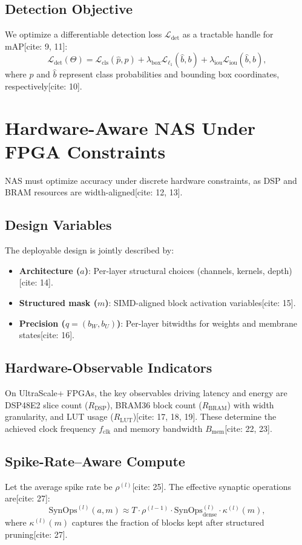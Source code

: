 \documentclass[10pt,journal,compsoc]{IEEEtran}
\newcommand{\SynOps}{\text{SynOps}}
\begin{document}
\subsection{Detection Objective}
We optimize a differentiable detection loss $\mathcal{L}_{\text{det}}$ as a tractable handle for mAP[cite: 9, 11]:
\begin{equation}
\mathcal{L}_{\text{det}}(\Theta) = \mathcal{L}_{\text{cls}}(\hat{p}, p) + \lambda_{\text{box}}\mathcal{L}_{\ell_1}(\hat{b}, b) + \lambda_{\text{iou}}\mathcal{L}_{\text{iou}}(\hat{b}, b),
\end{equation}
where $\hat{p}$ and $\hat{b}$ represent class probabilities and bounding box coordinates, respectively[cite: 10].

\section{Hardware-Aware NAS Under FPGA Constraints}
NAS must optimize accuracy under discrete hardware constraints, as DSP and BRAM resources are width-aligned[cite: 12, 13].

\subsection{Design Variables}
The deployable design is jointly described by:
\begin{itemize}
    \item \textbf{Architecture ($a$)}: Per-layer structural choices (channels, kernels, depth)[cite: 14].
    \item \textbf{Structured mask ($m$)}: SIMD-aligned block activation variables[cite: 15].
    \item \textbf{Precision ($q = (b_W, b_U)$)}: Per-layer bitwidths for weights and membrane states[cite: 16].
\end{itemize}

\subsection{Hardware-Observable Indicators}
On UltraScale+ FPGAs, the key observables driving latency and energy are DSP48E2 slice count ($R_{\text{DSP}}$), BRAM36 block count ($R_{\text{BRAM}}$) with width granularity, and LUT usage ($R_{\text{LUT}}$)[cite: 17, 18, 19]. These determine the achieved clock frequency $f_{\text{clk}}$ and memory bandwidth $B_{\text{mem}}$[cite: 22, 23].

\subsection{Spike-Rate--Aware Compute}
Let the average spike rate be $\rho^{(l)}$[cite: 25]. The effective synaptic operations are[cite: 27]:
\begin{equation}
\SynOps^{(l)}(a,m) \approx T \cdot \rho^{(l-1)} \cdot \SynOps^{(l)}_{\text{dense}} \cdot \kappa^{(l)}(m),
\end{equation}
where $\kappa^{(l)}(m)$ captures the fraction of blocks kept after structured pruning[cite: 27].
\end{document}
